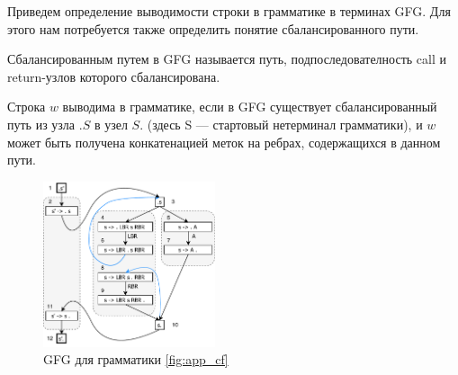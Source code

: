 Приведем определение выводимости строки в грамматике в терминах GFG. Для этого нам потребуется также определить понятие сбалансированного пути.

\begin{definition}
    Сбалансированным путем в GFG называется путь, подпоследователность call и return-узлов которого сбалансирована. 
\end{definition}

\begin{definition}
    Строка $w$ выводима в грамматике, если в GFG существует сбалансированный путь из узла $.S$ в узел $S.$ (здесь S --- стартовый нетерминал грамматики), и $w$ может быть получена конкатенацией меток на ребрах, содержащихся в данном пути. 
\end{definition}



\begin{figure}[h]
    \centering
    \includegraphics[width=0.45\textwidth]{pictures/gfg_enum}
    \caption{GFG для грамматики \ref{fig:app_cf}}
    \label{fig:gfg}
\end{figure}
